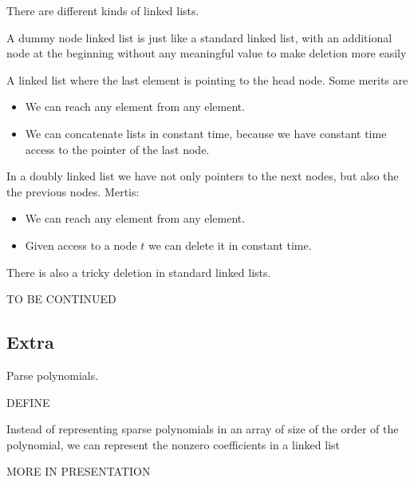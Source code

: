 \documentclass[11pt,a4paper]{article}
\begin{document}
There are different kinds of linked lists.

\begin{example}
  A dummy node linked list is just like a standard linked list,
  with an additional node at the beginning without any meaningful value
  to make deletion more easily
\end{example}

\begin{example}
  A linked list where the last element is pointing to the head node.
  Some merits are
  \begin{itemize}
    \item We can reach any element from any element.
    \item We can concatenate lists in constant time, because we have constant
      time access to the pointer of the last node.
  \end{itemize}
\end{example}

\begin{example}
  In a doubly linked list we have not only pointers to the next nodes,
  but also the the previous nodes.
  Mertis:
  \begin{itemize}
    \item We can reach any element from any element.
    \item Given access to a node $t$ we can delete it in constant time.
  \end{itemize}
\end{example}

There is also a tricky deletion in standard linked lists.

TO BE CONTINUED

\subsection{Extra}

Parse polynomials.

\begin{definition}
  DEFINE
\end{definition}

Instead of representing sparse polynomials in an array of size of the order
of the polynomial, we can represent the nonzero coefficients in a linked list

MORE IN PRESENTATION
\end{document}
